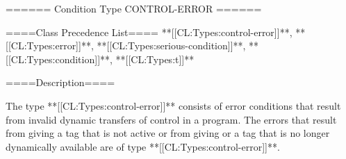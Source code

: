 ====== Condition Type CONTROL-ERROR ======

====Class Precedence List==== **[[CL:Types:control-error]]**, **[[CL:Types:error]]**, **[[CL:Types:serious-condition]]**, **[[CL:Types:condition]]**, **[[CL:Types:t]]**

====Description====

The type **[[CL:Types:control-error]]** consists of error conditions that result from invalid dynamic transfers of control in a program. The errors that result from giving  a tag that is not active or from giving  or  a tag that is no longer dynamically available are of type **[[CL:Types:control-error]]**.

